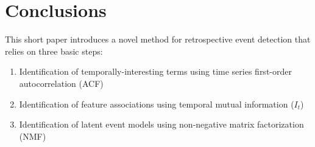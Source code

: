 \documentclass{sig-alternate}
\begin{document}

\section{Conclusions}

This short paper introduces a novel method for retrospective event detection that relies on three basic steps:
\begin{enumerate}
\item Identification of temporally-interesting terms using time series first-order autocorrelation (ACF)
\item Identification of feature associations using temporal mutual information ($I_t$)
\item Identification of latent event models using non-negative matrix factorization (NMF)
\end{enumerate}
\end{document}
